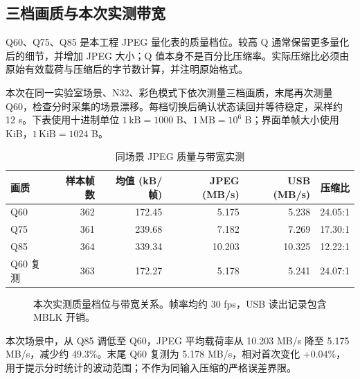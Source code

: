 \subsection{三档画质与本次实测带宽}
Q60、Q75、Q85 是本工程 JPEG 量化表的质量档位。较高 Q 通常保留更多量化后的细节，并增加 JPEG 大小；Q 值本身不是百分比压缩率。实际压缩比必须由原始有效载荷与压缩后的字节数计算，并注明原始格式。

本次在同一实验室场景、N32、彩色模式下依次测量三档画质，末尾再次测量 Q60，检查分时采集的场景漂移。每档切换后确认状态读回并等待稳定，采样约 12 s。下表使用十进制单位 $1\,\mathrm{kB}=1000$ B、$1\,\mathrm{MB}=10^6$ B；界面单帧大小使用 KiB，$1\,\mathrm{KiB}=1024$ B。

\begin{table}[H]\centering\caption{同场景 JPEG 质量与带宽实测}\label{tab:livequality}
\small\begin{tabular}{@{}lrrrrr@{}}\toprule
画质 & 样本帧数 & 均值 (kB/帧) & JPEG (MB/s) & USB (MB/s) & 压缩比\\\midrule
Q60 & 362 & 172.45 & 5.175 & 5.238 & 24.05:1\\
Q75 & 361 & 239.68 & 7.182 & 7.269 & 17.30:1\\
Q85 & 364 & 339.34 & 10.203 & 10.325 & 12.22:1\\
Q60 复测 & 363 & 172.27 & 5.178 & 5.241 & 24.07:1\\
\bottomrule\end{tabular}\end{table}

\begin{figure}[H]\centering
{}
\caption{本次实测质量档位与带宽关系。帧率均约 30 fps，USB 读出记录包含 MBLK 开销。}\label{fig:livebandwidth}
\end{figure}
本次场景中，从 Q85 调低至 Q60，JPEG 平均载荷率从 10.203 MB/s 降至 5.175 MB/s，减少约 49.3\%。末尾 Q60 复测为 5.178 MB/s，相对首次变化 +0.04\%，用于提示分时统计的波动范围；不作为同输入压缩的严格误差界限。
\clearpage

